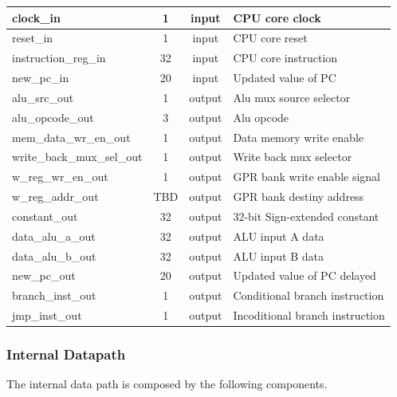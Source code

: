 \documentclass{article}
\begin{document}
\begin{center}
\begin{longtable}[pos]{| l | c | c | m{7cm} |}
      	clock\_in 		          & 1 	& input 	& CPU core clock  	\\ \hline
      	reset\_in 		          & 1	  & input		& CPU core reset  	\\ \hline
      	instruction\_reg\_in    & 32	& input 	& CPU core instruction \\ \hline
      	new\_pc\_in 	          & 20	& input 	& Updated value of PC \\ \hline
      	alu\_src\_out 	            & 1	  & output 	& Alu mux source selector \\ \hline
      	alu\_opcode\_out 	      & 3	  & output 	& Alu opcode  \\ \hline
      	mem\_data\_wr\_en\_out 	        & 1	& output 	& Data memory write enable  \\ \hline
      	write\_back\_mux\_sel\_out 	    & 1	& output	  & Write back mux selector \\ \hline
      	w\_reg\_wr\_en\_out 	    & 1	& output 	& GPR bank write enable signal  \\ \hline
      	w\_reg\_addr\_out  & TBD   & output   & GPR bank destiny address \\ \hline
        constant\_out 	        & 32 & output 	& 32-bit Sign-extended constant  \\ \hline
        data\_alu\_a\_out    & 32   & output  & ALU input A data \\ \hline
        data\_alu\_b\_out & 32 & output & ALU input B data \\ \hline
        new\_pc\_out    & 20  & output  & Updated value of PC delayed  \\ \hline
        branch\_inst\_out         & 1  & output  & Conditional branch instruction  \\ \hline

        jmp\_inst\_out & 1 & output  & Incoditional branch instruction  \\ \hline
      \end{longtable}
    \end{center}
    
  \subsubsection{Internal Datapath} 
  The internal data path is composed by the following components.
\end{document}
